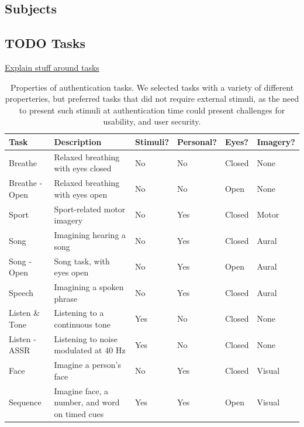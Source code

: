 \documentclass[letterpaper,twocolumn,10pt]{article}
\begin{document}
\subsection{Subjects}
\label{sec:orgaf30da9}
\subsection{{\bfseries\sffamily TODO} Tasks}

\underline{Explain stuff around tasks}

\begin{table}[t]
\centering
\begin{tabularx}{\textwidth}{llllll}
Task & Description & Stimuli? & Personal? & Eyes? & Imagery?\\
\hline
Breathe & Relaxed breathing with eyes closed & No & No & Closed & None\\
Breathe - Open & Relaxed breathing with eyes open & No & No & Open & None\\
Sport & Sport-related motor imagery & No & Yes & Closed & Motor\\
Song & Imagining hearing a song & No & Yes & Closed & Aural\\
Song - Open & Song task, with eyes open & No & Yes & Open & Aural\\
Speech & Imagining a spoken phrase & No & Yes & Closed & Aural\\
Listen \& Tone & Listening to a continuous tone & Yes & No & Closed & None\\
Listen - ASSR & Listening to noise modulated at 40 Hz & Yes & No & Closed & None\\
Face & Imagine a person's face & No & Yes & Closed & Visual\\
Sequence & Imagine face, a number, and word on timed cues & Yes & Yes & Open & Visual\\
\hline
\end{tabularx}
\caption{Properties of authentication tasks. We selected tasks with a variety of different properteries, but preferred tasks that did not require external stimuli, as the need to present such stimuli at authentication time could present challenges for usability, and user security.}
\label{tab:addlabel}%
\end{table}
\end{document}
